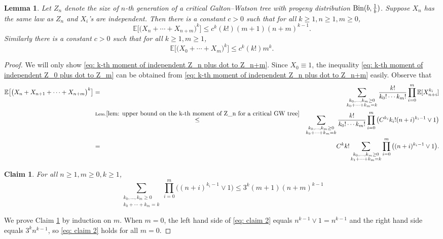 \documentclass[12pt]{article}
\newtheorem{lemma}[theorem]{Lemma}
\newtheorem{claim}[theorem]{Claim}
\numberwithin{equation}{section}
\newcommand{\be}{\begin{equation}}
\newcommand{\ee}{\end{equation}}
\newcommand{\1}{\mathbf{1}}
\begin{document}
\begin{lemma}\label{lem: k-th moment of Z_n plus dot to Z_n+m}
	Let $Z_n$ denote the size of $n$-th generation of a critical Galton--Watson tree with progeny distribution $\textnormal{Bin}(b,\frac{1}{b})$. Suppose $X_n$ has the same law as $Z_n$ and $X_i$'s are independent. Then there is a constant $c>0$ such that for all $k\geq 1,n\geq1,m\geq0$,
	\be\label{eq: k-th moment of independent Z_n plus dot to Z_n+m}
	\mathbb{E}\big[\big(X_n+\cdots+X_{n+m}\big)^k\big]\leq c^k(k!)(m+1)(n+m)^{k-1}.
	\ee
	Similarly there is a constant $c>0$ such that for all $k\geq 1,m\geq1$,
	\be\label{eq: k-th moment of independent Z_0 plus dot to Z_m}
	\mathbb{E}\big[\big(X_0+\cdots+X_{m}\big)^k\big]\leq c^k(k!)m^k.
	\ee
\end{lemma}
\begin{proof}
	We will only show \eqref{eq: k-th moment of independent Z_n plus dot to Z_n+m}. Since $X_0\equiv1$, the inequality \eqref{eq: k-th moment of independent Z_0 plus dot to Z_m} can be obtained from \eqref{eq: k-th moment of independent Z_n plus dot to Z_n+m} easily. 
 Observe that
	\begin{eqnarray}\label{eq: decomposition of the k-th power of the sum of X_n, X_n+m}
	\mathbb{E}\big[\big(X_n+X_{n+1}+\cdots+X_{n+m}\big)^k\big]
	&=&\sum_{\substack{k_0,\ldots,k_m\geq0\\k_0+\cdots+k_m=k} }{\frac{k!}{k_0!\cdots k_m!}}\prod_{i=0}^{m}\mathbb{E}[X_{n+i}^{k_i}]\nonumber\\
	&\stackrel{\textnormal{Lem.}\ref{lem: upper bound on the k-th moment of Z_n for a critical GW tree}}{\leq } & \sum_{\substack{k_0,\ldots,k_m\geq0\\k_0+\cdots+k_m=k} }\frac{k!}{k_0!\cdots k_m!}\prod_{i=0}^{m}\big(C^{k_i}k_i!(n+i)^{k_i-1}\vee 1\big)\nonumber\\
	&=&C^kk!\sum_{\substack{k_0,\ldots,k_m\geq0\\k_1+\cdots+k_m=k} }\prod_{i=0}^{m}\big((n+i)^{k_i-1}\vee 1\big).
	\end{eqnarray}
	\begin{claim}\label{claim: C9}
		For all $n\geq1,m\geq0,k\geq1$,
		\be\label{eq: claim 2}
		\sum_{\substack{k_0,\ldots,k_m\geq0\\k_0+\cdots+k_m=k} }\prod_{i=0}^{m}\big((n+i)^{k_i-1}\vee 1\big)\leq 3^k(m+1)(n+m)^{k-1}
		\ee
	\end{claim}	

		We prove  Claim \ref{claim: C9} by induction on $m$. When $m=0$, the left hand side of \eqref{eq: claim 2} equals $n^{k-1}\vee1=n^{k-1}$ and the right hand side equals $3^kn^{k-1}$, so \eqref{eq: claim 2} holds for all $m=0$.
		

\end{proof}
\end{document}
